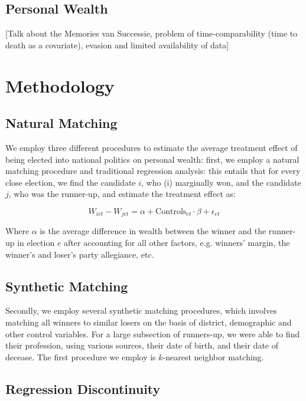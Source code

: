 \documentclass[12pt]{article}
\begin{document}
\subsection{Personal Wealth}

[Talk about the Memories van Successie, problem of time-comparability (time to death as a covariate), evasion and limited availability of data]


\section{Methodology}

\subsection{Natural Matching}

We employ three different procedures to estimate the average treatment effect of being elected into national politics on personal wealth: first, we employ a natural matching procedure and traditional regression analysis: this entails that for every close election, we find the candidate $i$, who (i) marginally won, and the candidate $j$, who was the runner-up, and estimate the treatment effect as:

\begin{equation}
    W_{iet} - W_{jet} = \alpha + \text{Controls}_{et} \cdot \beta + \epsilon_{et}
\end{equation}

Where $\alpha$ is the average difference in wealth between the winner and the runner-up in election $e$ after accounting for all other factors, e.g. winners' margin, the winner's and loser's party allegiance, etc.  

\subsection{Synthetic Matching}
Secondly, we employ several synthetic matching procedures, which involves matching all winners to similar losers on the basis of district, demographic and other control variables. For a large subsection of runners-up, we were able to find their profession, using various sources, their date of birth, and their date of decease. The first procedure we employ is $k$-nearest neighbor matching. 

\subsection{Regression Discontinuity}
\end{document}
